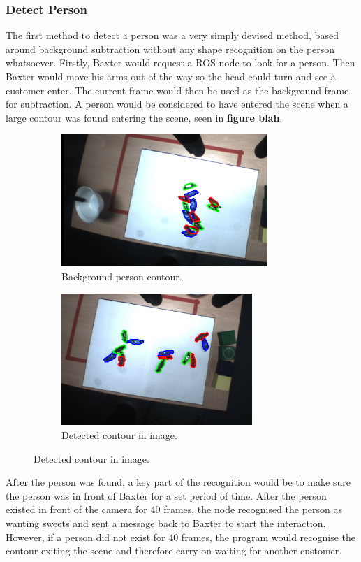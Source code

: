 \subsubsection{Detect Person}
The first method to detect a person was a very simply devised method, based around background subtraction without any shape recognition on the person whatsoever. Firstly, Baxter would request a ROS node to look for a person. Then Baxter would move his arms out of the way so the head could turn and see a customer enter. The current frame would then be used as the background frame for subtraction. A person would be considered to have entered the scene when a large contour was found entering the scene, seen in \textbf{figure blah}.
\begin{figure}[H]
    \captionsetup[subfigure]{justification=centering}
    \begin{subfigure}[H!]{0.475\textwidth}   
        \centering 
        \includegraphics[width=\textwidth, height=5cm]{convexhulloverlappissues.png}
        \caption{Background person contour.}
        \label{fig:TimeGrasp}
    \end{subfigure}
    \begin{subfigure}[H]{0.475\textwidth}   
        \centering 
        \includegraphics[width=\textwidth, height=5cm]{collisioncorrectdetection.png}
        \caption{Detected contour in image.}
        \label{fig:TimeGrasp}
    \end{subfigure}
\end{figure}
After the person was found, a key part of the recognition would be to make sure the person was in front of Baxter for a set period of time. After the person existed in front of the camera for 40 frames, the node recognised the person as wanting sweets and sent a message back to Baxter to start the interaction. However, if a person did not exist for 40 frames, the program would recognise the contour exiting the scene and therefore carry on waiting for another customer.
